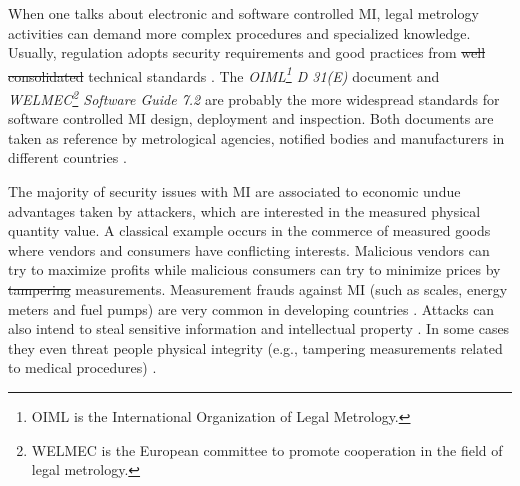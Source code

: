 \documentclass[journal]{IEEEtran}
\providecommand{\DIFadd}[1]{{\protect\color{blue}\uwave{#1}}} %
\providecommand{\DIFdel}[1]{{\protect\color{red}\sout{#1}}}                      %
\providecommand{\DIFaddbegin}{} %
\providecommand{\DIFaddend}{} %
\providecommand{\DIFdelbegin}{} %
\providecommand{\DIFdelend}{} %
\begin{document}
When one talks about electronic and software controlled MI, legal metrology activities can demand more complex procedures and specialized knowledge. Usually, regulation adopts security requirements and good practices from \DIFdelbegin \DIFdel{well consolidated }\DIFdelend \DIFaddbegin \DIFadd{well-known }\DIFaddend technical standards \cite{Esche2015,Peters2015,Luchsinger2008}. The \emph{OIML\footnote{OIML is the International Organization of Legal Metrology.} D 31(E)} document \cite{InternationalOrganizationofLegalMetrologyOIML2008} and \emph{WELMEC\footnote{WELMEC is the European committee to promote cooperation in the field of legal metrology.} Software Guide 7.2} \cite{EuropeanCooperationinLegalMetrologyWELMEC2015} are probably the more widespread standards for software controlled MI design, deployment and inspection. Both documents are taken as reference by metrological agencies, notified bodies and manufacturers in different countries \cite{Camara2012,Peters2015}.

The majority of security issues with MI are associated to economic undue advantages taken by attackers, which are interested in the measured physical quantity value. A classical example occurs in the commerce of measured goods where vendors and consumers have conflicting interests\cite{RodriguesFilho2015}. Malicious vendors can try to maximize profits while malicious consumers can try to minimize prices by \DIFdelbegin \DIFdel{tampering }\DIFdelend \DIFaddbegin \DIFadd{frauding }\DIFaddend measurements. Measurement frauds against MI (such as scales, energy meters and fuel pumps) are very common in developing countries \cite{Camara2012,Luchsinger2008}. Attacks can also intend to steal sensitive information and intellectual property \cite{Camara2012,Oppermann2016}. In some cases they even threat people physical integrity (e.g., tampering measurements related to medical procedures) \cite{Boccardo2014}.
\end{document}
